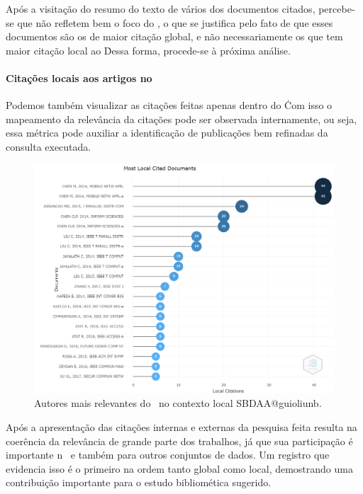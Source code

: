 Após a visitação do resumo do texto de vários dos documentos citados, percebe-se que não refletem bem o foco do \dataset, o que se justifica pelo fato de que esses documentos são os de maior citação global, e não necessariamente os que tem maior citação local ao \dataset\. Dessa forma, procede-se à próxima análise.

\paragraph{Citações locais aos artigos no \dataset}

Podemos também visualizar as citações feitas apenas dentro do \dataset\. Com isso o mapeamento da relevância da citações pode ser observada internamente, ou seja, essa métrica pode auxiliar a identificação de publicações bem refinadas da consulta executada.  


\begin{figure}
    \centering
    \includegraphics[angle=0,width=1\textwidth]{experiments/guioliunb/AnaliseBibliometrica/SocialBigDataAnalysis/MOST LOCAL CITED.png}
    \caption{Autores mais relevantes do \dataset\ no contexto local   SBDAA@guioliunb.}
    \label{fig:SBDAA@guioliunb:relevantdocuments}
\end{figure}


Após a apresentação das citações internas e externas da pesquisa feita resulta na coerência da relevância de grande parte dos trabalhos, já que sua participação é importante n \dataset\ e também para outros conjuntos de dados. Um registro que evidencia isso é o primeiro na ordem tanto global como local, demostrando uma contribuição importante para o estudo bibliomética sugerido.

